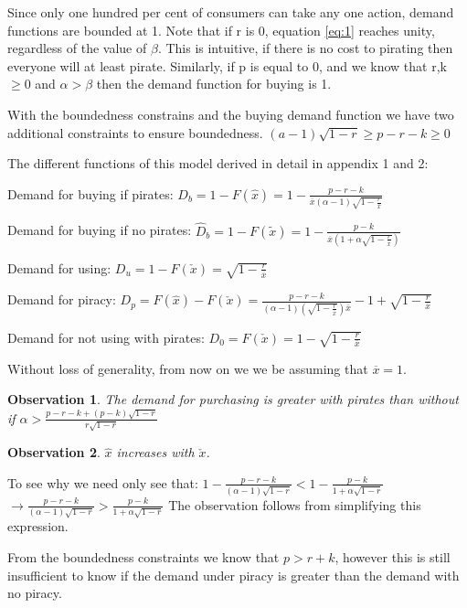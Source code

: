 \documentclass{article}
\newtheorem{observation}{Observation}
\begin{document}
Since only one hundred per cent of consumers can take any one action, demand functions are bounded at 1. Note that if r is 0, equation \ref{eq:1} reaches unity, regardless of the value of $\beta$. This is intuitive, if there is no cost to pirating then everyone will at least pirate. Similarly, if p is equal to 0, and we know that r,k $\geq 0$ and $\alpha>\beta$ then the demand function for buying is 1. 

With the boundedness constrains and the buying demand function we have two additional constraints to ensure boundedness. $(a-1)\sqrt{1-r} \geq p-r-k \geq 0$

The different functions of this model derived in detail in appendix 1 and 2: 

Demand for buying if pirates: 
$D_b = 1 - F(\hat{x}) = 1 - \frac{p-r-k}{\overline{x}(\alpha - 1)  \sqrt{1-\frac{r}{\overline{x}}}  }$

Demand for buying if no pirates: $ \hat{D}_b =1-F(\tilde{x}) = 1-\frac{p-k}{\overline{x}(1 + \alpha \sqrt{1-\frac{r}{\overline{x}}}) }$

Demand for using: $D_u = 1 - F(\check{x}) =  \sqrt{1-\frac{r}{\overline{x}}}$

Demand for piracy: $D_p = F(\hat{x})-F(\check{x})= \frac{p-r-k}{(\alpha - 1) (  \sqrt{1-\frac{r}{\overline{x}}}) \overline{x}} - 1 +  \sqrt{1-\frac{r}{\overline{x}}}$

Demand for not using with pirates: $D_0 = F(\check{x})=1 - \sqrt{1-\frac{r}{\overline{x}}}$

Without loss of generality, from now on we we be assuming that $\overline{x}=1$.

\begin{observation}
The demand for purchasing is greater with pirates than without if $\alpha>\frac{p-r-k+(p-k)\sqrt{1-r}}{r\sqrt{1-r}}$ 
\end{observation}

\begin{observation}
$\hat{x}$ increases with $\check{x}$. 
\end{observation}

To see why we need only see that:
$1- \frac{p-r-k}{(\alpha-1)\sqrt{1-r}}<1- \frac{p-k}{1+\alpha \sqrt{1-r}}$
$\rightarrow \frac{p-r-k}{(\alpha-1)\sqrt{1-r}}>\frac{p-k}{1+\alpha \sqrt{1-r}}$
The observation follows from simplifying this expression. 


From the boundedness constraints we know that $p>r+k$, however this is still insufficient to know if the demand under piracy is greater than the demand with no piracy. 
\end{document}
